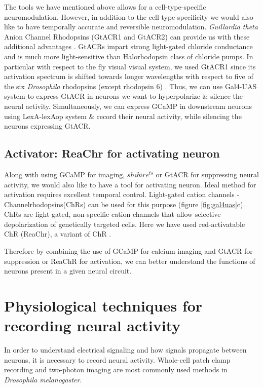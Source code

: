 The tools we have mentioned above allows for a cell-type-specific neuromodulation. However, in addition to the cell-type-specificity we would also like to have temporally accurate and reversible neuromodulation. \textit{Guillardia theta} Anion Channel Rhodopsins (GtACR1 and GtACR2) can provide us with these additional advantages \parencite{Govorunova2015}. GtACRs impart strong light-gated chloride conductance and is much more light-sensitive than Halorhodopsin class of chloride pumps. In particular with respect to the fly visual visual system, we used GtACR1 since its activation spectrum is shifted towards longer wavelengths with respect to five of the six \textit{Drosophila} rhodopsins (except rhodopsin 6) \parencite{Mauss2017, Mohammad2017}. Thus, we can use Gal4-UAS system to express GtACR in neurons we want to hyperpolarize \& silence the neural activity. Simultaneously, we can express GCaMP in downstream neurons using LexA-lexAop system \& record their neural activity, while silencing the neurons expressing GtACR. 

 
\subsection{Activator: ReaChr for activating neuron}
Along with using GCaMP for imaging, $shibire^{ts}$ or GtACR for suppressing neural activity, we would also like to have a tool for activating neuron. Ideal method for activation requires excellent temporal control. Light-gated cation channels - Channelrhodopsins(ChRs) can be used for this purpose (figure  \ref{fig:gal4uas}c). ChRs are light-gated, non-specific cation channels that allow selective depolarization of genetically targeted cells. Here we have used red-activatable ChR (ReaChr), a variant of ChR \parencite{Lin2013, Busch2018}. 

Therefore by combining the use of GCaMP for calcium imaging and GtACR for suppression or ReaChR for activation, we can better understand the functions of neurons present in a given neural circuit.

\section{Physiological techniques for recording neural activity}
In order to understand electrical signaling and how signals propagate between neurons, it is necessary to record neural activity. Whole-cell patch clamp recording and two-photon imaging are most commonly used methods in \textit{Drosophila melanogaster}.

